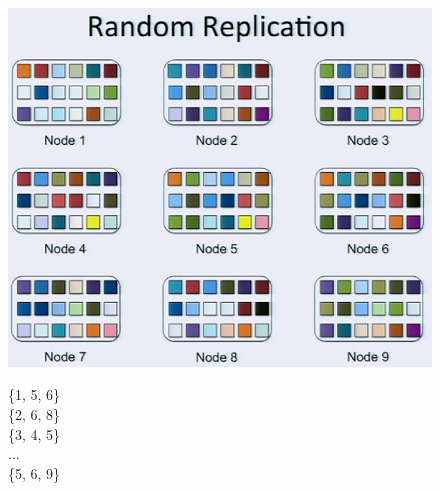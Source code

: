\documentclass[xcolor=table]{beamer}
\begin{document}
	\begin{frame}
		\begin{figure}[htb]
			\begin{minipage}[b]{0.69\linewidth}
				\centering
				\graphicspath{{fig/}}
				\includegraphics[width=1\textwidth]{3.png}
			\end{minipage}
			\begin{minipage}[b]{0.29\linewidth}
				\begin{center}
					\alert{	\{1, 5, 6\}\\
							\{2, 6, 8\}\\
							\{3, 4, 5\}\\
							...\\
							\{5, 6, 9\} }
				\end{center}
			\end{minipage}
		\end{figure}
	\end{frame}
\end{document}
